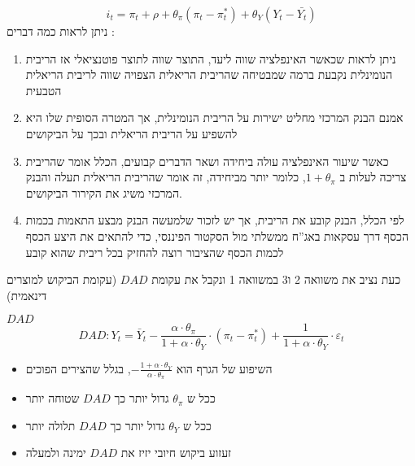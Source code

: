 \documentclass[usenames,dvipsnames]{beamer}
\begin{document}
\begin{RTL}
\begin{frame}[allowframebreaks]
    \framebreak
    $$i_t = \pi_t + \rho +\theta_\pi \left(\pi_t - \pi^*_t\right) + \theta_Y \left(Y_t - \bar{Y_t}\right)$$
    ניתן לראות כמה דברים :
    \begin{enumerate}
        \item ניתן לראות שכאשר האינפלציה שווה ליעד, התוצר שווה לתוצר פוטנציאלי אז הריבית הנומינלית נקבעת ברמה שמבטיחה שהריבית הריאלית הצפויה שווה לריבית הריאלית הטבעית
        \item אמנם הבנק המרכזי מחליט ישירות על הריבית הנומינלית, אך המטרה הסופית שלו היא להשפיע על הריבית הריאלית ובכך על הביקושים
        \item כאשר שיעור האינפלציה עולה ביחידה ושאר הדברים קבועים, הכלל אומר שהריבית צריכה לעלות ב $1 + \theta_\pi$, כלומר יותר מביחידה, זה אומר שהריבית הריאלית תעלה והבנק המרכזי משיג את הקירור הביקושים.
        \item לפי הכלל, הבנק קובע את הריבית, אך יש לזכור שלמעשה הבנק מבצע התאמות בכמות הכסף דרך עסקאות באג''ח ממשלתי מול הסקטור הפיננסי, כדי להתאים את היצע הכסף לכמות הכסף שהציבור רוצה להחזיק בכל ריבית שהוא קובע
    \end{enumerate}

    \framebreak
    כעת נציב את משוואה 2 ו3 במשוואה 1 ונקבל את עקומת $DAD$ (עקומת הביקוש למוצרים דינאמית)
    \begin{block}{$DAD$}
        $$
D A D: Y_t=\bar{Y}_t-\frac{\alpha \cdot \theta_\pi}{1+\alpha \cdot \theta_Y} \cdot\left(\pi_t-\pi_t^*\right)+\frac{1}{1+\alpha \cdot \theta_Y} \cdot \varepsilon_t
$$
        \begin{itemize}
            \item השיפוע של הגרף הוא $-\frac{1 + \alpha \cdot \theta_Y}{\alpha \cdot \theta_\pi}$, בגלל שהצירים הפוכים
            \item ככל ש $\theta_\pi$ גדול יותר כך $DAD$ שטוחה יותר
            \item ככל ש $\theta_Y$ גדול יותר כך $DAD$ תלולה יותר
            \item זעזוע ביקוש חיובי יזיז את $DAD$ ימינה ולמעלה
        \end{itemize}
        
    \end{block}
    

\end{frame}


\end{RTL}
\end{document}
